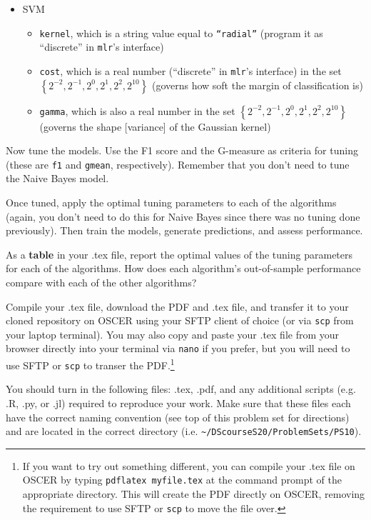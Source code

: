\documentclass[12pt,english]{exam}
\begin{document}
\begin{questions}
\begin{itemize}
\begin{itemize}
    \end{itemize}
\item SVM
    \begin{itemize}
    \item \texttt{kernel}, which is a string value equal to \texttt{``radial''} (program it as ``discrete'' in \texttt{mlr}'s interface)
    \item \texttt{cost}, which is a real number (``discrete'' in \texttt{mlr}'s interface) in the set $\left\{2^{-2},2^{-1},2^{0},2^{1},2^{2},2^{10}\right\}$ (governs how soft the margin of classification is)
    \item \texttt{gamma}, which is also a real number in the set $\left\{2^{-2},2^{-1},2^{0},2^{1},2^{2},2^{10}\right\}$ (governs the shape [variance] of the Gaussian kernel) 
    \end{itemize}
\end{itemize}


\question Now tune the models. Use the F1 score and the G-measure as criteria for tuning (these are \texttt{f1} and \texttt{gmean}, respectively). Remember that you don't need to tune the Naive Bayes model.

\question Once tuned, apply the optimal tuning parameters to each of the algorithms (again, you don't need to do this for Naive Bayes since there was no tuning done previously). Then train the models, generate predictions, and assess performance.

\question As a \textbf{table} in your .tex file, report the optimal values of the tuning parameters for each of the algorithms. How does each algorithm's out-of-sample performance compare with each of the other algorithms?

\question Compile your .tex file, download the PDF and .tex file, and transfer it to your cloned repository on OSCER using your SFTP client of choice (or via \texttt{scp} from your laptop terminal). You may also copy and paste your .tex file from your browser directly into your terminal via \texttt{nano} if you prefer, but you will need to use SFTP or \texttt{scp} to transer the PDF.\footnote{If you want to try out something different, you can compile your .tex file on OSCER by typing \texttt{pdflatex myfile.tex} at the command prompt of the appropriate directory. This will create the PDF directly on OSCER, removing the requirement to use SFTP or \texttt{scp} to move the file over.}

\question You should turn in the following files: .tex, .pdf, and any additional scripts (e.g. .R, .py, or .jl) required to reproduce your work.  Make sure that these files each have the correct naming convention (see top of this problem set for directions) and are located in the correct directory (i.e. \texttt{\textasciitilde/DScourseS20/ProblemSets/PS10}).


\end{questions}
\end{document}
